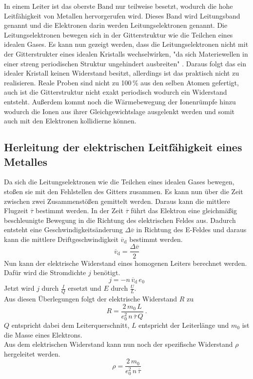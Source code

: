 In einem Leiter ist das oberste Band nur teilweise besetzt, wodurch die hohe Leitfähigkeit von Metallen hervorgerufen wird. Dieses Band wird Leitungsband genannt und die Elektronen darin werden Leitungselektronen genannt. Die Leitungselektronen bewegen sich in der Gitterstruktur wie die Teilchen eines idealen Gases. Es kann nun gezeigt werden, dass die Leitungselektronen nicht mit der Gitterstrukter eines idealen Kristalls wechselwirken, "da sich Materiewellen in einer streng periodischen Struktur ungehindert ausbreiten" \cite[2]{sample}. Daraus folgt das ein idealer Kristall keinen Widerstand besitzt, allerdings ist das praktisch nicht zu realisieren. Reale Proben sind nicht zu 100\,\% aus den selben Atomen gefertigt, auch ist die Gitterstruktur nicht exakt periodisch wodurch ein Widerstand entsteht. Außerdem kommt noch die Wärmebewegung der Ionenrümpfe hinzu wodurch die Ionen aus ihrer Gleichgewichtslage ausgelenkt werden und somit auch mit den Elektronen kollidierne können.


\subsection{Herleitung der elektrischen Leitfähigkeit eines Metalles}
Da sich die Leitungselektronen wie die Teilchen eines idealen Gases bewegen, stoßen sie mit den Fehlstellen des Gitters zusammen. Es kann nun über die Zeit zwischen zwei Zusammenstößen gemittelt werden. Daraus kann die mittlere Flugzeit $\overline{\tau}$ bestimmt werden. In der Zeit $\overline{\tau}$ führt das Elektron eine gleichmäßig beschleunigte Bewegung in die Richtung des elektrischen Feldes aus. Dadurch entsteht eine Geschwindigkeitsänderung $\Delta\overline{v}$ in Richtung des E-Feldes und daraus kann die mittlere Driftgeschwindigkeit $\overline{v}_\text{d}$ bestimmt werden.
\begin{equation}
	\overline{v}_\text{d} = \frac{\Delta\overline{v}}{2}
\end{equation}
Nun kann der elektrische Widerstand eines homogenen Leiters berechnet werden. Dafür wird die Stromdichte $j$ benötigt.
\begin{equation}
	j = -n\,\overline{v}_\text{d}\,e_0
	\label{eqn:j}
\end{equation}
Jetzt wird $j$ durch $\frac{I}{Q}$ ersetzt und $E$ durch $\frac{U}{L}$. \\
Aus diesen Überlegungen folgt der elektrische Widerstand $R$ zu
\begin{equation}
	R = \frac{2\,m_0\,L}{e_0^2\,n\,\overline{\tau}\,Q} \ .
	\label{eqn:R}
\end{equation}
$Q$ entspricht dabei dem Leiterquerschnitt, $L$ entspricht der Leiterlänge und $m_0$ ist die Masse eines Elektrons. \\
Aus dem elektrischen Widerstand kann nun noch der spezifische Widerstand $\rho$ hergeleitet werden.
\begin{equation}
	\rho = \frac{2\,m_0}{e_0^2\,n\,\overline{\tau}}
\end{equation}


